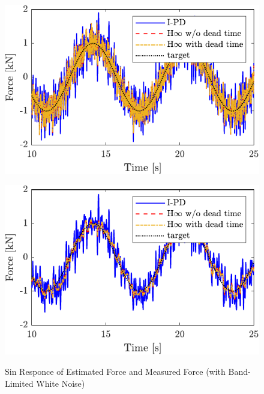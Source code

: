 \begin{figure}[t]
    \begin{minipage}{\minipageratio\hsize}
    \centering
        \includegraphics[keepaspectratio, scale = \minifigscale]{contents/ForceControl/figure/1115/crop-1115_diffnoise_estforce_sin.pdf}
        \label{fig4:crop-1115_diffnoise_estforce_sin}
    \end{minipage} 
    \begin{minipage}{\minipageratio\hsize}
    \centering
        \includegraphics[keepaspectratio, scale = \minifigscale]{contents/ForceControl/figure/1115/crop-1115_diffnoise_force_sin.pdf}
        \label{fig4:crop-1115_diffnoise_force_sin}
    \end{minipage}
    \caption{Sin Responce of Estimated Force and Measured Force (with Band-Limited White Noise)}
    \label{fig4:crop-1115_diffnoise_sin}
\end{figure}